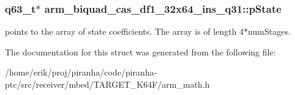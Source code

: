 \subsubsection[{\texorpdfstring{p\+State}{pState}}]{\setlength{\rightskip}{0pt plus 5cm}q63\+\_\+t$\ast$ arm\+\_\+biquad\+\_\+cas\+\_\+df1\+\_\+32x64\+\_\+ins\+\_\+q31\+::p\+State}\hypertarget{structarm__biquad__cas__df1__32x64__ins__q31_a4c899cdfaf2bb955323e93637bd662e0}{}\label{structarm__biquad__cas__df1__32x64__ins__q31_a4c899cdfaf2bb955323e93637bd662e0}
points to the array of state coefficients. The array is of length 4$\ast$num\+Stages. 

The documentation for this struct was generated from the following file\+:\begin{DoxyCompactItemize}
\item 
/home/erik/proj/piranha/code/piranha-\/ptc/src/receiver/mbed/\+T\+A\+R\+G\+E\+T\+\_\+\+K64\+F/arm\+\_\+math.\+h\end{DoxyCompactItemize}

